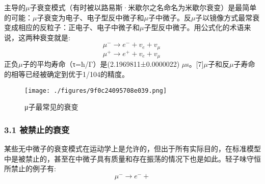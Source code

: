 主导的$\mu$子衰变模式（有时被以路易斯·米歇尔之名命名为米歇尔衰变）是最简单的可能：$\mu$子衰变为电子、电子型反中微子和$\mu$子中微子。反$\mu$子以镜像方式最常衰变成相应的反粒子：正电子、电子中微子和$\mu$子型反中微子。用公式化的术语来说，这两种衰变就是:
\begin{equation}
\mu^- \to e^-+v_e+v_\mu~
\end{equation}\begin{equation}
\mu^+ \to e^+ +v_e+v_\mu~
\end{equation}
正负$\mu$子的平均寿命（τ=ħ/Γ）是(2.1969811±0.0000022) $\mu$s。[7]$\mu$子和反$\mu$子寿命的相等已经被确定到优于1/104的精度。
\begin{figure}[ht]
\centering
\texttt{[image: ./figures/9f0c24095708e039.png]}
\caption{μ子最常见的衰变} \label{fig_MZ_1}
\end{figure}
\subsubsection{3.1 被禁止的衰变}
某些无中微子的衰变模式在运动学上是允许的，但出于所有实际目的，在标准模型中是被禁止的，甚至在中微子具有质量和存在振荡的情况下也是如此。轻子味守恒所禁止的例子有:
\begin{equation}
\mu^- \to e^- +
\end{equation}